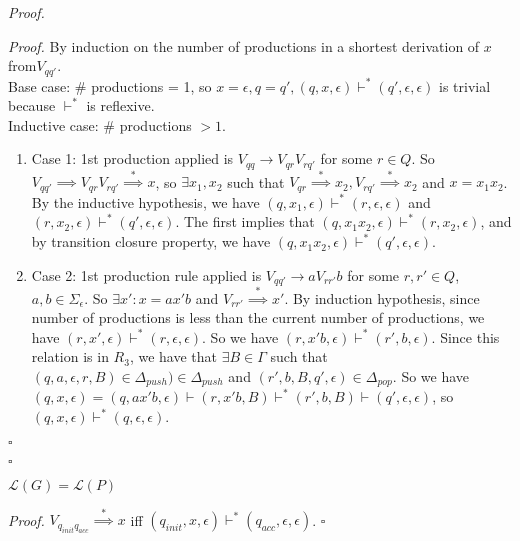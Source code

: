 \documentclass[a4paper]{article}
\newenvironment{proof}{\begin{breakbox}\textit{Proof.}}{\hfill$\square$\end{breakbox}}
\newcommand{\nl}{\vspace{0.2cm}\\}
\newcommand{\mc}{\mathcal}
\renewcommand{\L}{\mc{L}}
\newcommand{\produces}{\implies}
\newcommand{\derives}{\stackrel{*}{\implies}}
\newcommand{\changesto}{\vdash}
\begin{document}
\begin{proof}
\begin{proof}
        By induction on the number of productions in a shortest derivation of $x$ from$V_{qq'}$.\nl
        Base case: $\#$ productions = 1, so $x = \epsilon, q = q', (q, x, \epsilon) \changesto^* (q', \epsilon, \epsilon)$ is trivial because $\changesto^*$ is reflexive.\nl
        Inductive case: $\#$ productions $> 1$.
        \begin{enumerate}
            \item Case 1: 1st production applied is $V_{qq} \to V_{qr} V_{rq'}$ for some $r \in Q$. So $V_{qq'} \produces V_{qr}V_{rq'} \derives x$, so $\exists x_1, x_2$ such that $V_{qr} \derives
                x_2, V_{rq'} \derives x_2$ and $x = x_1x_2$. By the inductive hypothesis, we have $(q, x_1, \epsilon) \changesto^* (r, \epsilon, \epsilon)$ and $(r, x_2, \epsilon)
                \changesto^* (q', \epsilon, \epsilon)$. The first implies that $(q, x_1x_2, \epsilon) \changesto^* (r, x_2, \epsilon)$, and by transition closure property, we have $(q, x_1x_2,
                \epsilon) \changesto^* (q', \epsilon, \epsilon)$.
            \item Case 2: 1st production rule applied is $V_{qq'} \to aV_{rr'}b$ for some $r, r' \in Q$, $a, b \in \Sigma_{\epsilon}$. So $\exists x' : x = ax'b$ and $V_{rr'} \derives x'$. By
                induction hypothesis, since number of productions is less than the current number of productions, we have $(r, x', \epsilon) \changesto^* (r, \epsilon, \epsilon)$. So we have
                $(r, x'b, \epsilon) \changesto^* (r', b, \epsilon)$. Since this relation is in $R_3$, we have that $\exists B \in \Gamma$ such that $(q, a, \epsilon, r, B) \in \Delta_{push}) \in
                \Delta_{push}$ and $(r', b, B, q', \epsilon) \in \Delta_{pop}$. So we have $(q, x, \epsilon) = (q, ax'b, \epsilon) \changesto (r, x'b, B) \changesto^* (r', b, B) \changesto (q',
                \epsilon, \epsilon)$, so $(q, x, \epsilon) \changesto^* (q, \epsilon, \epsilon)$.
        \end{enumerate}
    \end{proof}
\end{proof}

\begin{cor}
    $\L(G) = \L(P)$
\end{cor}

\begin{proof}
    $V_{q_{init}q_{acc}} \derives x$ iff $(q_{init}, x, \epsilon) \changesto^* (q_{acc}, \epsilon, \epsilon)$.
\end{proof}
\end{document}
